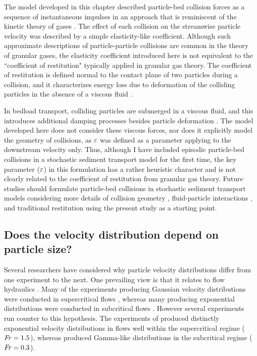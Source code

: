 The model developed in this chapter described particle-bed collision forces as a sequence of instantaneous impulses in an approach that is reminiscent of the kinetic theory of gases \citep{Landau1969}.
The effect of each collision on the streamwise particle velocity was described by a simple elasticity-like coefficient.
Although such approximate descriptions of particle-particle collisions are common in the theory of granular gases, the elasticity coefficient introduced here is not equivalent to the ``coefficient of restitution" typically applied in granular gas theory.
The coefficient of restitution is defined normal to the contact plane of two particles during a collision, and it characterizes energy loss due to deformation of the colliding particles in the absence of a viscous fluid \citep{Brach1992,Ismail2008}.

In bedload transport, colliding particles are submerged in a viscous fluid, and this introduces additional damping processes besides particle deformation \citep{Joseph2001,Yang2006,Schmeeckle2001}.
The model developed here does not consider these viscous forces, nor does it explicitly model the geometry of collisions, as $\varepsilon$ was defined as a parameter applying to the downstream velocity only.
Thus, although I have included episodic particle-bed collisions in a stochastic sediment transport model for the first time, the key parameter ($\varepsilon$) in this formulation has a rather heuristic character and is not clearly related to the coefficient of restitution from granular gas theory.
Future studies should formulate particle-bed collisions in stochastic sediment transport models considering more details of collision geometry \citep{Sekine1992}, fluid-particle interactions \citep{Marshall2011}, and traditional restitution \citep{Brach1989} using the present study as a starting point. 

\subsection{Does the velocity distribution depend on particle size?}

Several researchers have considered why particle velocity distributions differ from one experiment to the next.
One prevailing view is that it relates to flow hydraulics \citep{Wu2020}. Many of the experiments producing Gaussian velocity distributions were conducted in supercritical flows \citep[e.g.][]{Heyman2016,Martin2012,Ancey2014}, whereas many producing exponential distributions were conducted in subcritical flows \citep[e.g.][]{Fathel2015,Charru2004,Seizilles2014}.
However several experiments run counter to this hypothesis.
The experiments of \citet{Lajeunesse2010} produced distinctly exponential velocity distributions in flows well within the supercritical regime ($\mbox{\textit{Fr}}=1.5$), whereas \citet{Liu2019} produced Gamma-like distributions in the subcritical regime ($\mbox{\textit{Fr}}=0.3$).

